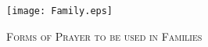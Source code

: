 \fancyhead[RE,LO]{}\fancyhead[RO,LE]{}
\fancyhead[C]{}\thispagestyle{empty}
{}
  \begin{center}
   \texttt{[image: Family.eps]}
   \par
   \vspace{2ex}
   	\textsc{\Huge{Forms of Prayer to be used in Families}}
   \end{center}